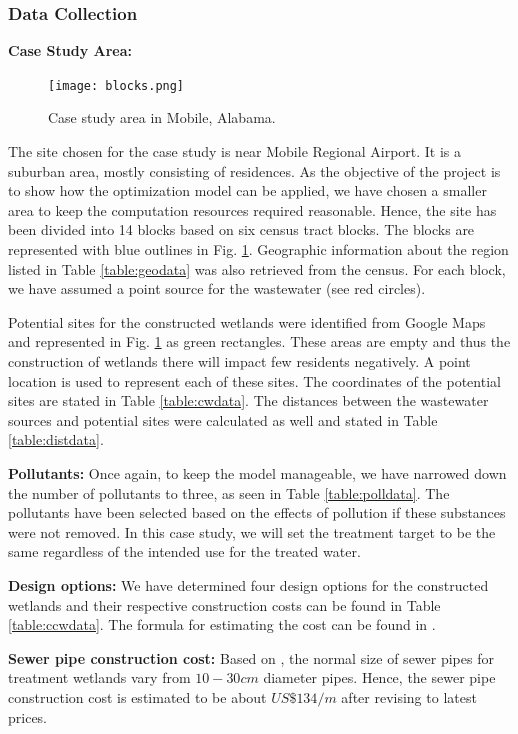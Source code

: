 \documentclass[preprint,12pt,authoryear]{elsarticle}
\begin{document}
\subsubsection{Data Collection}
\textbf{Case Study Area:}\begin{figure}[!b]
	\centering
	\texttt{[image: blocks.png]}
	\caption{Case study area in Mobile, Alabama.}
	\label{fig:blocks}
\end{figure}
The site chosen for the case study is near Mobile Regional Airport. It is a suburban area, mostly consisting of residences. As the objective of the project is to show how the optimization model can be applied, we have chosen a smaller area to keep the computation resources required reasonable. Hence, the site has been divided into 14 blocks based on six census tract blocks. The blocks are represented with blue outlines in Fig. \ref{fig:blocks}. Geographic information about the region listed in Table \ref{table:geodata} was also retrieved from the census. \citep{acs2015} For each block, we have assumed a point source for the wastewater (see red circles).

Potential sites for the constructed wetlands were identified from Google Maps and represented in Fig. \ref{fig:blocks} as green rectangles. These areas are empty and thus the construction of wetlands there will impact few residents negatively. A point location is used to represent each of these sites. The coordinates of the potential sites are stated in Table \ref{table:cwdata}. The distances between the wastewater sources and potential sites were calculated as well and stated in Table \ref{table:distdata}. 

\textbf{Pollutants:} Once again, to keep the model manageable, we have narrowed down the number of pollutants to three, as seen in Table \ref{table:polldata}. The pollutants have been selected based on the effects of pollution if these substances were not removed. In this case study, we will set the treatment target to be the same regardless of the intended use for the treated water.

\textbf{Design options:} We have determined four design options for the constructed wetlands and their respective construction costs can be found in Table \ref{table:ccwdata}. The formula for estimating the cost can be found in \cite{kadlec2009}.

\textbf{Sewer pipe construction cost:} Based on \cite{kadlec2009}, the normal size of sewer pipes for treatment wetlands vary from $10-30 cm$ diameter pipes. Hence, the sewer pipe construction cost is estimated to be about $US\$134/m$ \citep{usepa2000} after revising to latest prices. \\
\end{document}
